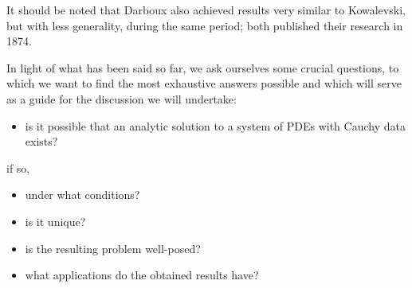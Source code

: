It should be noted that Darboux also achieved results very similar to Kowalevski, but with less generality, during the same period; both published their research in 1874.

In light of what has been said so far, we ask ourselves some crucial questions, to which we want to find the most exhaustive answers possible and which will serve as a guide for the discussion we will undertake:
\begin{itemize}
\item is it possible that an analytic solution to a system of PDEs with Cauchy data exists?
\end{itemize}
if so,
\begin{itemize}
\item under what conditions?
\item is it unique?
\item is the resulting problem well-posed?
\item what applications do the obtained results have?
\end{itemize}